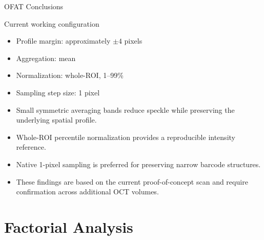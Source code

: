 \documentclass[aspectratio=169]{beamer}
\begin{document}
\begin{frame}{OFAT Conclusions}

\begin{alertblock}{Current working configuration}

\begin{itemize}
    \item Profile margin: approximately $\pm4$ pixels
    \item Aggregation: mean
    \item Normalization: whole-ROI, 1--99\%
    \item Sampling step size: 1 pixel
\end{itemize}

\end{alertblock}

\vspace{0.3cm}

\begin{itemize}
    \item Small symmetric averaging bands reduce speckle while preserving the
    underlying spatial profile.
    \item Whole-ROI percentile normalization provides a reproducible intensity
    reference.
    \item Native 1-pixel sampling is preferred for preserving narrow barcode
    structures.
    \item These findings are based on the current proof-of-concept scan and
    require confirmation across additional OCT volumes.
\end{itemize}

\end{frame}

\section{Factorial Analysis}
\end{document}
